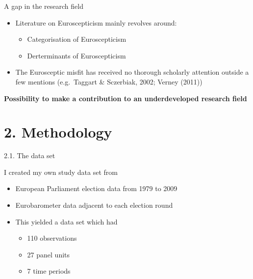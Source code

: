 \begin{frame}{A gap in the research field}

\begin{itemize}
\tightlist
\item
  Literature on Euroscepticism mainly revolves around:

  \begin{itemize}
  \tightlist
  \item
    Categorisation of Euroscepticism
  \item
    Derterminants of Euroscepticism
  \end{itemize}
\item
  The Eurosceptic misfit has received no thorough scholarly attention
  outside a few mentions (e.g.~Taggart \& Sczerbiak, 2002; Verney
  (2011))
\end{itemize}

\textbf{Possibility to make a contribution to an underdeveloped research
field}

\end{frame}

\section{2. Methodology}\label{methodology}

\begin{frame}{2.1. The data set}

I created my own study data set from

\begin{itemize}
\item
  European Parliament election data from 1979 to 2009
\item
  Eurobarometer data adjacent to each election round
\item
  This yielded a data set which had

  \begin{itemize}
  \tightlist
  \item
    110 observations\\
  \item
    27 panel units\\
  \item
    7 time periods
  \end{itemize}
\end{itemize}

\end{frame}

